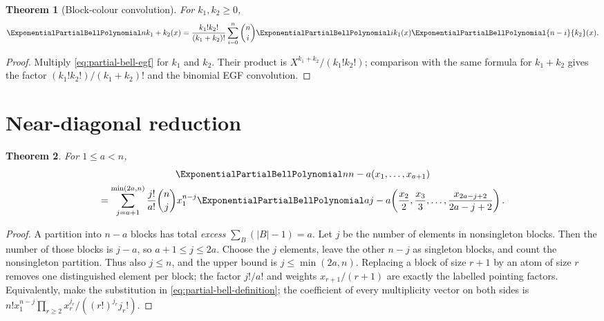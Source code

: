 \documentclass[11pt,a4paper,oneside,openany]{book}
\newtheorem{theorem}{Theorem}[chapter]
\theoremstyle{definition}
\theoremstyle{remark}
\begin{document}
\begin{theorem}[Block-colour convolution]\label{thm:bell-partial-convolution}
For $k_1,k_2\ge0$,
\begin{equation}\label{eq:bell-partial-convolution}
 \ExponentialPartialBellPolynomial n{k_1+k_2}(x)
 =\frac{k_1!k_2!}{(k_1+k_2)!}
 \sum_{i=0}^{n}\binom ni\ExponentialPartialBellPolynomial i{k_1}(x)\ExponentialPartialBellPolynomial{n-i}{k_2}(x).
\end{equation}
\end{theorem}
\begin{proof}
Multiply \eqref{eq:partial-bell-egf} for $k_1$ and $k_2$.  Their product is
$X^{k_1+k_2}/(k_1!k_2!)$; comparison with the same formula for $k_1+k_2$ gives the
factor $(k_1!k_2!)/(k_1+k_2)!$ and the binomial EGF convolution.
\end{proof}

\section{Near-diagonal reduction}
\begin{theorem}\label{thm:bell-near-diagonal}
For $1\le a<n$,
\begin{multline}\label{eq:bell-near-diagonal}
 \ExponentialPartialBellPolynomial n{n-a}(x_1,\ldots,x_{a+1})\\
 =\sum_{j=a+1}^{\min(2a,n)}\frac{j!}{a!}\binom nj x_1^{n-j}
 \ExponentialPartialBellPolynomial a{j-a}\!\left(\frac{x_2}{2},\frac{x_3}{3},\ldots,
 \frac{x_{2a-j+2}}{2a-j+2}\right).
\end{multline}
\end{theorem}
\begin{proof}
A partition into $n-a$ blocks has total \emph{excess}
$\sum_B(|B|-1)=a$.  Let $j$ be the number of elements in nonsingleton blocks.
Then the number of those blocks is $j-a$, so $a+1\le j\le2a$.  Choose the $j$
elements, leave the other $n-j$ as singleton blocks, and count the nonsingleton
partition.  Thus also $j\le n$, and the upper bound is $j\le\min(2a,n)$.
Replacing a block of size $r+1$ by an atom of size $r$ removes one
distinguished element per block; the factor $j!/a!$ and weights $x_{r+1}/(r+1)$
are exactly the labelled pointing factors.  Equivalently, make the substitution in
\eqref{eq:partial-bell-definition}; the coefficient of every multiplicity vector
on both sides is
$n!x_1^{n-j}\prod_{r\ge2}x_r^{j_r}/((r!)^{j_r}j_r!)$.
\end{proof}
\end{document}
